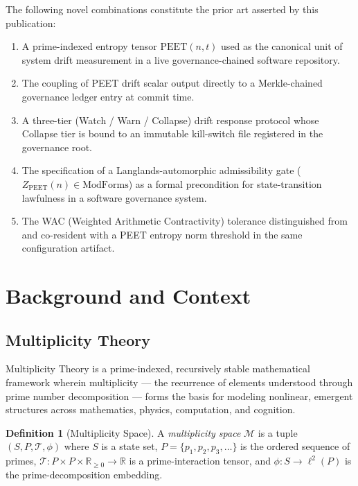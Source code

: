 \documentclass[11pt,letterpaper]{article}
\theoremstyle{definition}
\newtheorem{definition}{Definition}[section]
\theoremstyle{remark}
\newcommand{\peet}{\mathrm{PEET}}
\newcommand{\modforms}{\mathrm{ModForms}}
\begin{document}
The following novel combinations constitute the prior art asserted
by this publication:

\begin{enumerate}[leftmargin=2em]
  \item A prime-indexed entropy tensor \(\peet(n,t)\) used as the
        canonical unit of system drift measurement in a live
        governance-chained software repository.
  \item The coupling of PEET drift scalar output directly to a
        Merkle-chained governance ledger entry at commit time.
  \item A three-tier (Watch / Warn / Collapse) drift response
        protocol whose Collapse tier is bound to an immutable
        kill-switch file registered in the governance root.
  \item The specification of a Langlands-automorphic admissibility
        gate (\(Z_{\peet}(n) \in \modforms\)) as a formal
        precondition for state-transition lawfulness in a software
        governance system.
  \item The \textsc{WAC} (Weighted Arithmetic Contractivity)
        tolerance distinguished from and co-resident with a
        PEET entropy norm threshold in the same configuration
        artifact.
\end{enumerate}

\section{Background and Context}

\subsection{Multiplicity Theory}

Multiplicity Theory is a prime-indexed, recursively stable
mathematical framework wherein multiplicity --- the recurrence of
elements understood through prime number decomposition --- forms the
basis for modeling nonlinear, emergent structures across mathematics,
physics, computation, and cognition.

\begin{definition}[Multiplicity Space]
A \emph{multiplicity space} \(\mathcal{M}\) is a tuple
\((S, P, \mathcal{T}, \phi)\) where \(S\) is a state set,
\(P = \{p_1, p_2, p_3, \ldots\}\) is the ordered sequence of primes,
\(\mathcal{T}: P \times P \times \mathbb{R}_{\geq 0} \to \mathbb{R}\)
is a prime-interaction tensor, and
\(\phi: S \to \ell^2(P)\) is the prime-decomposition embedding.
\end{definition}
\end{document}
